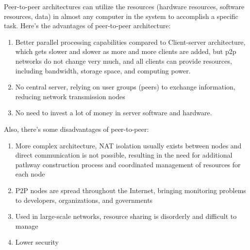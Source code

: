 \documentclass[11pt]{book}
\begin{document}
	Peer-to-peer architectures can utilize the resources (hardware resources, software resources, data) in almost any computer in the system to accomplish a specific task.
	Here's the advantages of peer-to-peer architecture:
	\begin{enumerate}
		\item 	Better parallel processing capabilities compared to Client-server architecture, 
		which gets slower and slower as more and more clients are added, 
		but p2p networks do not change very much, 
		and all clients can provide resources, 
		including bandwidth, storage space, and computing power.
		\item 	No central server, relying on user groups (peers) to exchange information, 
		reducing network transmission nodes
		\item 	No need to invest a lot of money in server software and hardware.

	\end{enumerate}
	Also, there's some disadvantages of peer-to-peer:
	\begin{enumerate}
		\item More complex architecture, NAT isolation usually exists between nodes and direct communication is not possible, resulting in the need for additional pathway construction process and coordinated management of resources for each node
		\item P2P nodes are spread throughout the Internet, bringing monitoring problems to developers, organizations, and governments
		\item Used in large-scale networks, resource sharing is disorderly and difficult to manage
		\item Lower security
	\end{enumerate}
\end{document}
